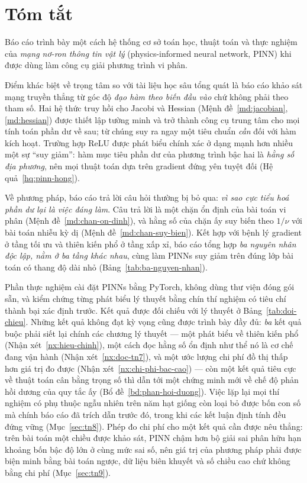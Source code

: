 
\chapter*{Tóm tắt}

Báo cáo trình bày một cách hệ thống cơ sở toán học, thuật toán và thực nghiệm
của \emph{mạng nơ-ron thông tin vật lý} (physics-informed neural network, PINN)
khi được dùng làm công cụ giải phương trình vi phân.

Điểm khác biệt về trọng tâm so với tài liệu học sâu tổng quát là báo cáo khảo
sát mạng truyền thẳng từ góc độ \emph{đạo hàm theo biến đầu vào} chứ không phải
theo tham số. Hai hệ thức truy hồi cho Jacobi và Hessian
(Mệnh đề~\ref{md:jacobian}, \ref{md:hessian}) được thiết lập tường minh và trở
thành công cụ trung tâm cho mọi tính toán phần dư về sau; từ chúng suy ra ngay
một tiêu chuẩn \emph{cần} đối với hàm kích hoạt. Trường hợp ReLU được phát biểu
chính xác ở dạng mạnh hơn nhiều một sự ``suy giảm'': hàm mục tiêu phần dư của
phương trình bậc hai là \emph{hằng số địa phương}, nên mọi thuật toán dựa trên
gradient đứng yên tuyệt đối (Hệ quả~\ref{hq:pinn-hong}).

Về phương pháp, báo cáo trả lời câu hỏi thường bị bỏ qua: \emph{vì sao cực tiểu
hoá phần dư lại là việc đáng làm}. Câu trả lời là một chặn ổn định của bài toán
vi phân (Mệnh đề~\ref{md:chan-on-dinh}), và hằng số của chặn ấy suy biến theo
$1/\nu$ với bài toán nhiễu kỳ dị (Mệnh đề~\ref{md:chan-suy-bien}). Kết hợp với
bệnh lý gradient ở tầng tối ưu và thiên kiến phổ ở tầng xấp xỉ, báo cáo tổng
hợp \emph{ba nguyên nhân độc lập, nằm ở ba tầng khác nhau}, cùng làm PINNs suy
giảm trên đúng lớp bài toán có thang độ dài nhỏ (Bảng~\ref{tab:ba-nguyen-nhan}).

Phần thực nghiệm cài đặt PINNs bằng PyTorch, không dùng thư viện đóng gói sẵn,
và kiểm chứng từng phát biểu lý thuyết bằng chín thí nghiệm có tiêu chí thành bại
xác định trước. Kết quả được đối chiếu với lý thuyết ở
Bảng~\ref{tab:doi-chieu}. Những kết quả không đạt kỳ vọng cũng được trình bày
đầy đủ: \emph{ba} kết quả buộc phải siết lại chính các chương lý thuyết --- một
phát biểu về thiên kiến phổ (Nhận xét~\ref{nx:hieu-chinh}), một cách đọc hằng số
ổn định như thể nó là cơ chế đang vận hành (Nhận xét~\ref{nx:doc-tn7}), và một
ước lượng chi phí đồ thị thấp hơn giá trị đo được
(Nhận xét~\ref{nx:chi-phi-bac-cao}) --- còn một kết quả tiêu cực về thuật toán
cân bằng trọng số thì dẫn tới một chứng minh mới về chế độ phản hồi dương của
quy tắc ấy (Bổ đề~\ref{bd:phan-hoi-duong}). Việc lặp lại mọi thí nghiệm có phụ thuộc ngẫu
nhiên trên năm hạt giống còn loại bỏ được bốn con số mà chính báo cáo đã trích
dẫn trước đó, trong khi các kết luận định tính đều đứng vững
(Mục~\ref{sec:tn8}). Phép đo chi phí cho một kết quả cần được nêu
thẳng: trên bài toán một chiều được khảo sát, PINN chậm hơn bộ giải sai phân hữu
hạn khoảng bốn bậc độ lớn ở cùng mức sai số, nên giá trị của phương pháp phải được biện minh
bằng bài toán ngược, dữ liệu biên khuyết và số chiều cao chứ không bằng chi phí
(Mục~\ref{sec:tn9}).

